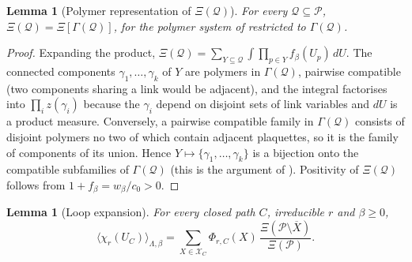 \documentclass[11pt,a4paper]{article}
\newtheorem{lemma}[theorem]{Lemma}
\theoremstyle{definition}
\theoremstyle{remark}
\newcommand{\cP}{\mathcal{P}}
\newcommand{\dU}{\,dU}
\newcommand{\cX}{\mathcal{X}}
\newcommand{\cQ}{\mathcal{Q}}
\newcommand{\Flab}[2]{\cite[#1 \texttt{#2}]{F}}
\begin{document}
\begin{lemma}[Polymer representation of $\Xi(\cQ)$]\label{al:lem:Xipolymer}
For every $\cQ\subseteq\cP$, $\Xi(\cQ)=\Xi[\Gamma(\cQ)]$, for the polymer system of
\Flab{Definition}{def:polymer} restricted to $\Gamma(\cQ)$.
\end{lemma}

\begin{proof}
Expanding the product, $\Xi(\cQ)=\sum_{Y\subseteq\cQ}\int\prod_{p\in Y}f_\beta(U_p)\dU$. The connected components
$\gamma_1,\dots,\gamma_k$ of $Y$ are polymers in $\Gamma(\cQ)$, pairwise compatible (two components sharing a link
would be adjacent), and the integral factorises into $\prod_iz(\gamma_i)$ because the $\gamma_i$ depend on disjoint sets
of link variables and $dU$ is a product measure. Conversely, a pairwise compatible family in $\Gamma(\cQ)$ consists
of disjoint polymers no two of which contain adjacent plaquettes, so it is the family of components of its union. Hence
$Y\mapsto\{\gamma_1,\dots,\gamma_k\}$ is a bijection onto the compatible subfamilies of $\Gamma(\cQ)$ (this is the
argument of \Flab{Proposition}{prop:polymer}). Positivity of $\Xi(\cQ)$ follows from $1+f_\beta=w_\beta/c_0>0$.
\end{proof}

\begin{lemma}[Loop expansion]\label{al:lem:loopexp}
For every closed path $C$, irreducible $r$ and $\beta\ge0$,
\[
\langle\chi_r(U_C)\rangle_{\Lambda,\beta}=\sum_{X\in\cX_C}\Phi_{r,C}(X)\,\frac{\Xi(\cP\setminus\overline X)}{\Xi(\cP)} .
\]
\end{lemma}
\end{document}
